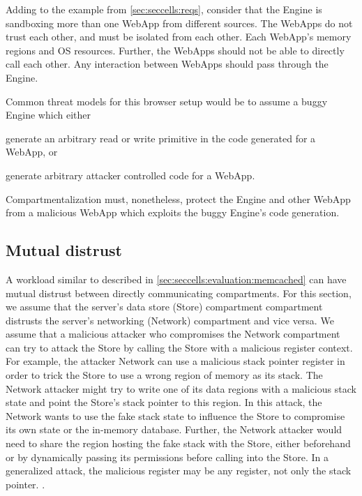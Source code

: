 Adding to the example from \autoref{sec:seccells:reqs}, consider that the
Engine is sandboxing more than one WebApp from different sources.
The WebApps do not trust each other, and must be isolated from each other.
Each WebApp's memory regions and OS resources.
Further, the WebApps should not be able to directly call each other.
Any interaction between WebApps should pass through the Engine.

Common threat models for this browser setup would be to assume a buggy Engine
which either
\begin{inparaenum}
      \item generate an arbitrary read or write primitive in the code generated
            for a WebApp, or 
      \item generate arbitrary attacker controlled code for a WebApp.
\end{inparaenum}
Compartmentalization must, nonetheless, protect the Engine and other WebApp 
from a malicious WebApp which exploits the buggy Engine's code generation.

\subsection{Mutual distrust} 
\label{sec:compreview:usecases:distrust}
A workload similar to  described in 
\autoref{sec:seccells:evaluation:memcached} can have mutual distrust
between directly communicating compartments.
For this section, we assume that the server's data store (Store) compartment
compartment distrusts the server's networking (Network) compartment and
vice versa.
We assume that a malicious attacker who compromises the Network compartment
can try to attack the Store by calling the Store with a malicious register
context.
For example, the attacker Network can use a malicious stack pointer register 
in order to trick the Store to use a wrong region of memory as its stack.
The Network attacker might try to write one of its data regions with a malicious
stack state and point the Store's stack pointer to this region.
In this attack, the Network wants to use the fake stack state to influence the
Store to compromise its own state or the in-memory database.
Further, the Network attacker would need to share the region hosting the fake
stack with the Store, either beforehand or by dynamically passing its 
permissions before calling into the Store.
In a generalized attack, the malicious register may be any register, not
only the stack pointer.
.

